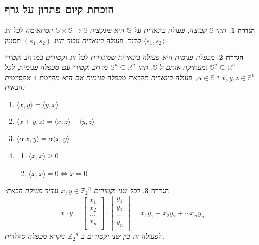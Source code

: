 \documentclass[12pt,leqno]{article}
\theoremstyle{theoremdd}
\newtheorem{definition}{הגדרה}[section]
\newcommand{\Zn}{{\mathbb{Z}_2}^n}
\begin{document}
\subsection{הוכחת קיום פתרון על גרף}
\begin{definition}
    תהי 
    $\mathbb{S}$
    קבוצה,
    פעולה בינארית על 
    $\mathbb{S}$
    היא פונקציה
    $\mathbb{S} \times \mathbb{S} \rightarrow \mathbb{S}$
    המתאימה לכל זוג 
    סדור.
    פעולה בינארית 
    עבור הזוג
    $(s_1, s_2)$
    תסומן
    $\langle s_1, s_2 \rangle$.
\end{definition}
\begin{definition}
    מכפלה פנימית 
    היא פעולה
    בינארית
    שמוגדרת לכל זוג וקטורים 
    במרחב וקטורי 
    $\mathbb{S}^n \subseteq \mathbb{R}^n$
    ומעתיקה אותם 
    ל
    $\mathbb{S}$.
    תהי 
    $\mathbb{S}^n \subseteq \mathbb{R}^n$
    מרחב וקטורי עם מכפלה פנימית,
    לכל
    $x,y,z \in \mathbb{S}^n$
    ו
    $\alpha \in \mathbb{S}$,
    פעולה בינארית תקראה מכפלה פנימית אם היא מקיימת
    $4$
    אקסיומות
    הבאות:
    \begin{enumerate}
        \item 
        $\langle x, y \rangle = \langle y,x \rangle$
        \item 
        $\langle x + y, z \rangle = \langle x, z \rangle + \langle y, z \rangle$
        \item 
        $\langle \alpha \ x, y \rangle = \alpha \langle x, y \rangle$
        \item 
        \begin{enumerate}
            \item 
            $\langle x, x \rangle \ge 0$ 
            \item 
            $\langle x, x \rangle = 0 \Longleftrightarrow  x = \vec{0}$ 
        \end{enumerate}
    \end{enumerate}
\end{definition}
\begin{definition}
    \label{def:inner_mul}
    לכל שני וקטורים
    $x, y \in \Zn$
    נגדיר פעולה הבאה:
    \begin{equation}
        x \cdot y = 
        \begin{bmatrix}
            x_1 \\
            x_2 \\
            \cdots \\
            x_n \\
        \end{bmatrix}
        \cdot 
        \begin{bmatrix}
            y_1 \\
            y_2 \\
            \cdots \\
            y_n \\
        \end{bmatrix}
        = 
        x_1 y_1 + x_2 y_2 + \cdots x_n y_n
    \end{equation}
    לפעולה זה
    בין שני וקטורים ב
    $\Zn$
    ניקרא מכפלה סקלרית. 
\end{definition}
\end{document}
